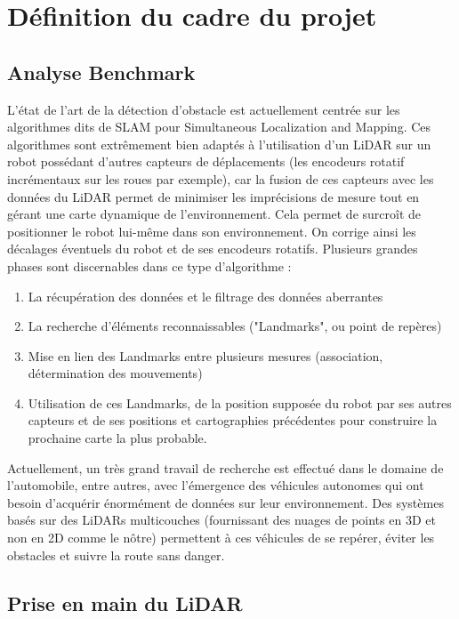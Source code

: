 \section{Définition du cadre du projet}

\subsection{Analyse Benchmark}

\tab L'état de l'art de la détection d'obstacle est actuellement centrée sur les algorithmes dits de SLAM pour Simultaneous Localization and Mapping. Ces algorithmes sont extrêmement bien adaptés à l'utilisation d'un LiDAR sur un robot possédant d'autres capteurs de déplacements (les encodeurs rotatif incrémentaux sur les roues par exemple), car la fusion de ces capteurs avec les données du LiDAR permet de minimiser les imprécisions de mesure tout en gérant une carte dynamique de l'environnement. Cela permet de surcroît de positionner le robot lui-même dans son environnement. On corrige ainsi les décalages éventuels du robot et de ses encodeurs rotatifs. Plusieurs grandes phases sont discernables dans ce type d'algorithme :

\begin{enumerate}
    \item La récupération des données et le filtrage des données aberrantes
    \item La recherche d'éléments reconnaissables ("Landmarks", ou point de repères)
    \item Mise en lien des Landmarks entre plusieurs mesures (association, détermination des mouvements)
    \item Utilisation de ces Landmarks, de la position supposée du robot par ses autres capteurs et de ses positions et cartographies précédentes pour construire la prochaine carte la plus probable.
\end{enumerate}

Actuellement, un très grand travail de recherche est effectué dans le domaine de l'automobile, entre autres, avec l'émergence des véhicules autonomes qui ont besoin d'acquérir énormément de données sur leur environnement. Des systèmes basés sur des LiDARs multicouches (fournissant des nuages de points en 3D et non en 2D comme le nôtre) permettent à ces véhicules de se repérer, éviter les obstacles et suivre la route sans danger.

\subsection{Prise en main du LiDAR}
